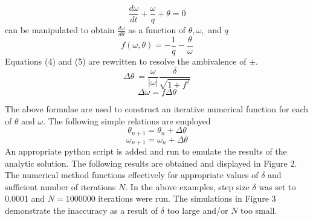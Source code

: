 \documentclass[12pt]{article}
\newenvironment{problem}[2][Problem]{\begin{trivlist}
\item[\hskip \labelsep {\bfseries #1}\hskip \labelsep {\bfseries #2.}]}{\end{trivlist}}
\begin{document}
\begin{problem}{5}
\[\frac{d\omega}{dt} + \frac{\omega}{q} + \theta = 0\]
can be manipulated to obtain $\frac{d\omega}{d\theta}$ as a function of $\theta, \omega,$ and $q$
\begin{equation}
    f(\omega, \theta) = -\frac{1}{q} - \frac{\theta}{\omega}
\end{equation}
Equations (4) and (5) are rewritten to resolve the ambivalence of $\pm$. 
\[\Delta\theta\ = \frac{\omega}{|\omega|}\frac{\delta}{\sqrt{1+f^2}}\]
\[\Delta\omega = f\Delta\theta\]

The above formulae are used to construct an iterative numerical function for each of $\theta$ and $\omega$. The following simple relations are employed
\[\theta_{n+1} = \theta_n + \Delta\theta\]
\[\omega_{n+1} = \omega_n + \Delta\theta\]
An appropriate python script is added and run to emulate the results of the analytic solution. The following results are obtained and displayed in Figure 2. The numerical method functions effectively for appropriate values of $\delta$ and sufficient number of iterations $N$. In the above examples, step size $\delta$ was set to 0.0001 and $N = 1000000$ iterations were run. The simulations in Figure 3 demonstrate the inaccuracy as a result of $\delta$ too large and/or $N$ too small.

\end{problem}
\end{document}
